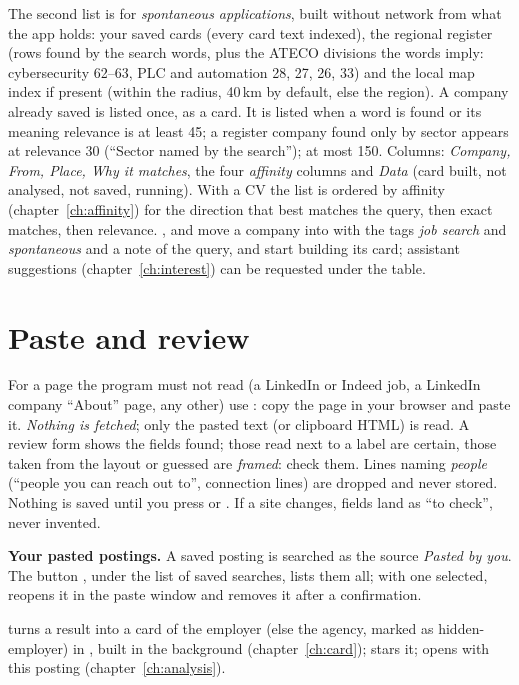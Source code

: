 The second list is for \emph{spontaneous applications}, built without network from what the app holds: your saved
cards (every card text indexed), the regional register (rows found by the search words, plus the ATECO divisions the
words imply: cybersecurity 62--63, PLC and automation 28, 27, 26, 33) and the local map index if present (within the
radius, 40\,km by default, else the region). A company already saved is listed once, as a card. It is listed when a
word is found or its meaning relevance is at least 45; a register company found only by sector appears at relevance
30 (``Sector named by the search''); at most 150. Columns: \emph{Company, From, Place, Why it matches}, the four
\emph{affinity} columns and \emph{Data} (card built, not analysed, not saved, running). With a CV the list is ordered
by affinity (chapter~\ref{ch:affinity}) for the direction that best matches the query, then exact matches, then
relevance. ,  and  move a company into  with the
tags \emph{job search} and \emph{spontaneous} and a note of the query, and start building its card; assistant
suggestions (chapter~\ref{ch:interest}) can be requested under the table.

\section{Paste and review}
For a page the program must not read (a LinkedIn or Indeed job, a LinkedIn company ``About'' page, any other) use
: copy the page in your browser and paste it. \emph{Nothing is fetched}; only
the pasted text (or clipboard HTML) is read. A review form shows the fields found; those read next to a label are
certain, those taken from the layout or guessed are \emph{framed}: check them. Lines naming \emph{people}
(``people you can reach out to'', connection lines) are dropped and never stored. Nothing is saved until you press
 or . If a site changes, fields land as ``to check'', never invented.

\textbf{Your pasted postings.} A saved posting is searched as the source \emph{Pasted by you}. The button
, under the list of saved searches, lists them all; with one selected,  reopens it in the paste window and  removes it after a confirmation.

 turns a result into a card of the employer (else the agency, marked as hidden-employer) in
, built in the background (chapter~\ref{ch:card});  stars it;  opens  with this posting (chapter~\ref{ch:analysis}).

